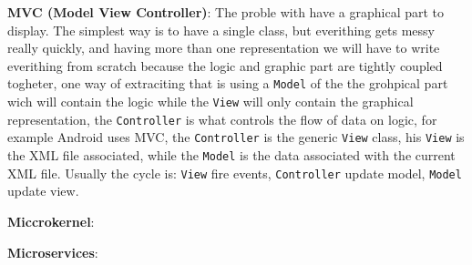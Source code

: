 \documentclass[12pt]{article}
\begin{document}
\textbf{MVC (Model View Controller)}: The proble with have a graphical part to display. The simplest way is to have a single class, but everithing gets messy really quickly, and having more than one representation we will have to write everithing from scratch because the logic and graphic part are tightly coupled togheter, one way of extraciting that is using a \texttt{Model} of the the grohpical part wich will contain the logic while the \texttt{View} will only contain the graphical representation, the \texttt{Controller} is what controls the flow of data on logic, for example Android uses MVC, the \texttt{Controller} is the generic \texttt{View} class, his \texttt{View} is the XML file associated, while the \texttt{Model} is the data associated with the current XML file. Usually the cycle is: \texttt{View} fire events, \texttt{Controller} update model, \texttt{Model} update view.

\textbf{Miccrokernel}: 

\textbf{Microservices}:
\end{document}
